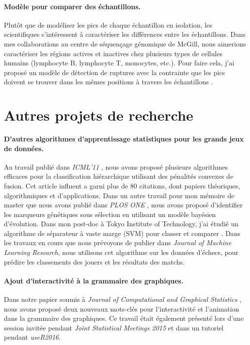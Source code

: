 \documentclass{article}
\begin{document}
\paragraph{Modèle pour comparer des échantillons.} Plutôt que de
modéliser les pics de chaque échantillon en isolation, les
scientifiques s'intéressent à caractériser les différences entre les
échantillons. Dans mes collaborations au centre de séquençage
génomique de McGill, nous aimerions caractériser les régions actives
et inactives chez plusieurs types de cellules humains (lymphocyte B,
lymphocyte T, monocytes, etc.). Pour faire cela, j'ai
proposé un modèle de détection de ruptures avec la contrainte que les
pics doivent se trouver dans les mêmes positions à travers les
échantillons \citep{HOCKING-PeakSegJoint}.

\section{Autres projets de recherche}

\paragraph{D'autres algorithmes d'apprentissage statistiques pour les grands jeux de données.} Au travail
publié dans \emph{ICML'11} \citep{HOCKING-clusterpath}, nous avons proposé plusieurs
algorithmes efficaces pour la classification hiérarchique utilisant des pénalités convexes de fusion. Cet article influent a garni plus de 80 citations, dont
papiers théoriques, algorithmiques et d'applications. Dans un autre travail pour mon
mémoire de master que nous avons publié dans \emph{PLOS ONE}
\citep{HOCKING-evolution}, nous avons proposé d'identifier les marqueurs génétiques
sous sélection en utilisant un modèle bayésien d'évolution. Dans
mon post-doc à Tokyo Institute of Technology, j'ai étudié un 
algorithme de séparateur à vaste marge (SVM) pour classer et comparer
\citep{svmcompare}. Dans les travaux en cours que nous prévoyons de publier dans
\emph{Journal of Machine Learning Research}, nous utilisons cet algorithme
sur les données d'échecs, pour prédire les
classements des jouers et les résultats des matchs.

\paragraph{Ajout d'interactivité à la grammaire des graphiques.} Dans notre papier
soumis à \emph{Journal of Computational and Graphical
  Statistics} \citep{animint}, nous avons proposé deux nouveaux mots-clés pour
l'interactivité et l'animation dans la grammaire des graphiques. Ce travail était
également présenté lors d'une session invitée pendant \emph{Joint Statistical
  Meetings 2015} et dans un tutoriel pendant \emph{useR2016}.
\end{document}
